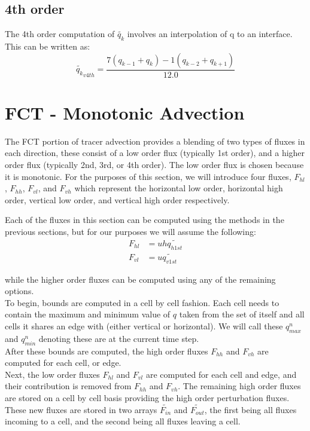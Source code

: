 \documentclass[11pt]{report}
\begin{document}
\subsection{4th order}
The 4th order computation of $\tilde{q_k}$ involves an interpolation of q to an interface. This can be written as:
\begin{equation}
	\tilde{q_k}_{v 4th} = \frac{ 7(q_{k-1} + q_{k}) - 1(q_{k-2} + q_{k+1})}{12.0}
\end{equation}


\section{FCT - Monotonic Advection}
The FCT portion of tracer advection provides a blending of two types of fluxes in each direction, these consist of a low order flux (typically 1st order), and a higher order flux (typically 2nd, 3rd, or 4th order). The low order flux is chosen because it is monotonic. For the purposes of this section, we will introduce four fluxes, $F_{hl}$, $F_{hh}$, $F_{vl}$, and $F_{vh}$ which represent the horizontal low order, horizontal high order, vertical low order, and vertical high order respectively.

Each of the fluxes in this section can be computed using the methods in the previous sections, but for our purposes we will assume the following:
\begin{align*}
	F_{hl} &= u h \tilde{q_{h 1st}} \\
	F_{vl} &= u \tilde{q_{v 1st}}
\end{align*}

while the higher order fluxes can be computed using any of the remaining options. \\

To begin, bounds are computed in a cell by cell fashion. Each cell needs to contain the maximum and minimum value of $q$ taken from the set of itself and all cells it shares an edge with (either vertical or horizontal). We will call these $q_{max}^n$ and $q_{min}^n$ denoting these are at the current time step. \\

After these bounds are computed, the high order fluxes $F_{hh}$ and $F_{vh}$ are computed for each cell, or edge. \\

Next, the low order fluxes $F_{hl}$ and $F_{vl}$ are computed for each cell and edge, and their contribution is removed from $F_{hh}$ and $F_{vh}$. The remaining high order fluxes are stored on a cell by cell basis providing the high order perturbation fluxes. These new fluxes are stored in two arrays $\tilde{F_{in}}$ and $\tilde{F_{out}}$, the first being all fluxes incoming to a cell, and the second being all fluxes leaving a cell. \\
\end{document}

